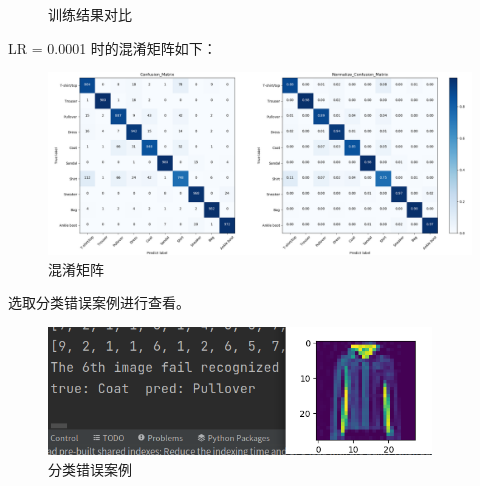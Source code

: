 \documentclass[12pt]{article}
\begin{document}
\begin{figure}[H]
		\centering
		\centering
		\caption{训练结果对比}
	\end{figure}
	
	LR = 0.0001 时的混淆矩阵如下：
	
	\begin{figure}[H]
		\centering
		\includegraphics[width=5.5in]{./images/fashion4.png}
		\centering
		\caption{混淆矩阵}
	\end{figure}


	选取分类错误案例进行查看。
	
	\begin{figure}[H]
		\centering
		\includegraphics[width=4in]{./images/fashion5.png}
		\centering
		\caption{分类错误案例}
	\end{figure}
	
\end{document}
